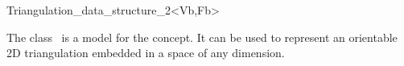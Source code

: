 

\begin{ccRefClass}{Triangulation_data_structure_2<Vb,Fb>}  %

\ccDefinition
  
The class \ccRefName\ is a  model
for the  concept.
It can be used to represent an orientable 2D triangulation
embedded in a space of any dimension.


\ccIsModel
{}




\end{ccRefClass}


